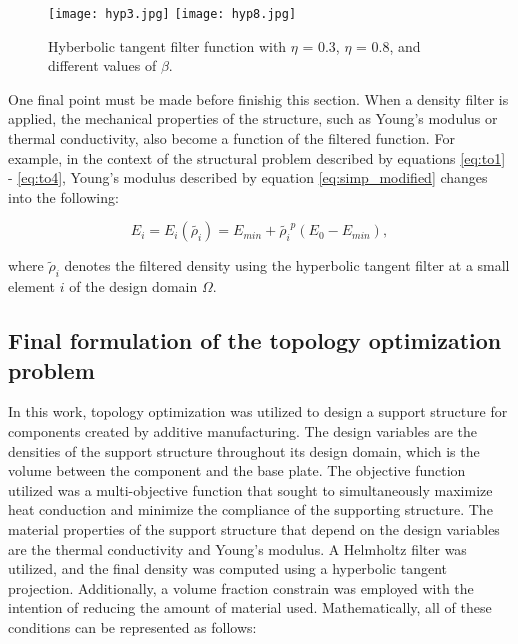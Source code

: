 \documentclass[../main.tex]{subfiles}
\begin{document}
\begin{figure}
  \texttt{[image: hyp3.jpg]} \hfill
  \texttt{[image: hyp8.jpg]} \hfill
  \caption{Hyberbolic tangent filter function with $\eta$ = 0.3, $\eta$ = 0.8, and different values of $\beta$.}
  \label{fig:tanh_filter}
\end{figure}

One final point must be made before finishig this section. When a density filter is applied, the mechanical properties of the structure, such as Young's modulus or thermal conductivity, also become a function of the filtered function. For example, in the context of the structural problem described by equations \ref{eq:to1} - \ref{eq:to4}, Young's modulus described by equation \ref{eq:simp_modified} changes into the following:

\begin{equation}
  E_i = E_i(\tilde{\rho_i}) = E_{min} + \tilde{\rho_i}^p (E_0 - E_{min}),
  \label{eq:young_filtered}
\end{equation}

where $\tilde{\rho}_i$ denotes the filtered density using the hyperbolic tangent filter at a small element $i$ of the design domain $\Omega$. 

\subsection{Final formulation of the topology optimization problem}

In this work, topology optimization was utilized to design a support structure for components created by additive manufacturing. The design variables are the densities of the support structure throughout its design domain, which is the volume between the component and the base plate. The objective function utilized was a multi-objective function that sought to simultaneously maximize heat conduction and minimize the compliance of the supporting structure. The material properties of the support structure that depend on the design variables are the thermal conductivity and Young's modulus. A Helmholtz filter was utilized, and the final density was computed using a hyperbolic tangent projection. Additionally, a volume fraction constrain was employed with the intention of reducing the amount of material used. Mathematically, all of these conditions can be represented as follows:
\end{document}
